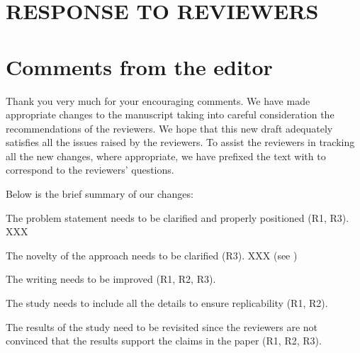 
\pagebreak
\newpage
\renewcommand*{\thesection}{\Alph{section}}
\nobalance
\section*{RESPONSE TO REVIEWERS}
\section*{Comments from the editor}


Thank you very much for your encouraging comments. We have made appropriate changes to the manuscript taking into careful consideration the recommendations of the reviewers. We hope that this new draft adequately satisfies all the issues raised by the reviewers. To assist the reviewers in tracking all the new changes, where appropriate, we have prefixed the text with  to correspond to the reviewers' questions.

Below is the brief summary of our changes:
\be
\item The problem statement needs to be clarified and properly positioned (R1, R3). XXX

\item The novelty of the approach needs to be clarified (R3). XXX (see )

\item The writing needs to be improved (R1, R2, R3).

\item The study needs to include all the details to ensure replicability (R1, R2).

\item The results of the study need to be revisited since the reviewers are not convinced that the results support the claims in the paper (R1, R2, R3).


